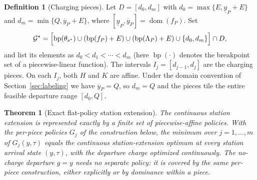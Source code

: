 \documentclass[review,3p,authoryear]{elsarticle}
\theoremstyle{plain}
\newtheorem{theorem}{Theorem}
\theoremstyle{definition}
\newtheorem{definition}{Definition}
\theoremstyle{remark}
\newcommand{\dom}{\operatorname{dom}}
\newcommand{\bp}{\operatorname{bp}}
\begin{document}
\begin{definition}[Charging pieces]
\label{def:cand}
Let $D=[d_0,d_m]$ with $d_0=\max\{E,\underline{y}_P+E\}$ and
$d_m=\min\{Q,\overline{y}_P+E\}$, where
$[\underline{y}_P,\overline{y}_P]=\dom(f_P)$. Set
\[
\mathcal{G}^\star=\Bigl[\bp(\theta_{s^\star})\cup(\bp(f_P)+E)\cup(\bp(\Lambda_P)+E)
\cup\{d_0,d_m\}\Bigr]\cap D,
\]
and list its elements as $d_0<d_1<\cdots<d_m$ (here $\bp(\cdot)$ denotes the breakpoint
set of a piecewise-linear function). The intervals
$I_j=[d_{j-1},d_j]$ are the charging pieces. On each $I_j$, both $H$ and $K$ are
affine. Under the domain convention of Section~\ref{sec:labeling} we have
$\overline{y}_P=Q$, so $d_m=Q$ and the pieces tile the entire feasible departure range
$[d_0,Q]$.
\end{definition}

\begin{theorem}[Exact flat-policy station extension]
\label{thm:continuous}
The continuous station extension is represented exactly by a finite set of
piecewise-affine policies. With the per-piece policies $G_j$ of the construction
below, the minimum over $j=1,\dots,m$ of $G_j(y,\tau)$ equals the continuous
station-extension optimum at every station arrival state $(y,\tau)$, with the departure
charge optimized continuously. The no-charge departure $g=y$ needs no separate policy:
it is covered by the same per-piece construction, either explicitly or by dominance
within a piece.
\end{theorem}
\end{document}
